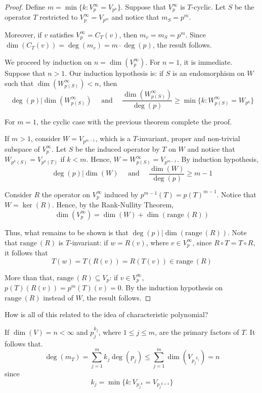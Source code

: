\begin{proof}
	Define $m = \min \{ k : V_p^\infty = V_{p^k} \}$. Suppose that $V_p^\infty$ is $T$-cyclic. Let $S$ be the operator $T$ restricted to $V_p^\infty = V_{p^m}$ and notice that $m_S = p^m$.
	
	Moreover, if $v$ satisfies $V_p^\infty = C_T(v)$, then $m_v = m_S = p^m$. Since $\dim(C_T(v)) = \deg (m_v) = m \cdot \deg(p)$, the result follows.

	We proceed by induction on $n = \dim (V_p^\infty)$. For $n = 1$, it is immediate. Suppose that $n > 1$. Our induction hypothesis is: if $S$ is an endomorphism on $W$ such that $\dim (W_{p(S)}^\infty) < n$, then
	\[
		\deg(p) | \dim (W_{p(S)}^\infty) \quad \text{ and } \quad \frac{\dim (W_{p(S)}^\infty)}{\deg(p)} \geq \min \{ k : W_{p(S)}^\infty = W_{p^k} \}
	\]

	For $m = 1$, the cyclic case with the previous theorem complete the proof.
	
	If $m > 1$, consider $W = V_{p^{m-1}}$, which is a $T$-invariant, proper and non-trivial subspace of $V_p^\infty$. Let $S$ be the induced operator by $T$ on $W$ and notice that $W_{p^k(S)} = V_{p^k(T)}$ if $k < m$. Hence, $W = W_{p(S)}^\infty = V_{p^{m-1}}$. By induction hypothesis,
	\[
		\deg(p) | \dim(W) \quad \text{ and } \quad \frac{\dim(W)}{\deg(p)} \geq m-1
	\]
	
	Consider $R$ the operator on $V_p^\infty$ induced by $p^{m-1}(T) = p(T)^{m-1}$. Notice that $W = \ker(R)$. Hence, by the Rank-Nullity Theorem,
	\[
		\dim(V_p^\infty) = \dim(W) + \dim(\text{range}~(R))
	\]
	
	Thus, what remains to be shown is that $\deg(p) | \dim(\text{range}~(R))$. Note that $\text{range}~(R)$ is $T$-invariant: if $w = R(v)$, where $v \in V_p^\infty$, since $R \circ T = T \circ R$, it follows that 
	\[
		T(w) = T(R(v)) = R(T(v)) \in \text{range}~(R)
	\]
	
	More than that, $\text{range}~(R) \subseteq V_p$: if $v \in V_p^\infty$, $p(T)(R(v)) = p^m(T)(v) = 0$. By the induction hypothesis on $\text{range}~(R)$ instead of $W$, the result follows.
\end{proof}

How is all of this related to the idea of characteristic polynomial?

If $\dim(V) = n < \infty$ and $p_j^{k_j}$, where $1 \leq j \leq m$, are the primary factors of $T$. It follows that.
\[
	\deg (m_T) = \sum_{j=1}^m k_j \deg (p_j) \leq \sum_{j=1}^m \dim(V_{{p_j}^{k_j}}) = n
\]
since 
\[
	k_j = \min \{ k : V_{{p_j}^k} = V_{{p_j}^{k+1}} \}
\]

